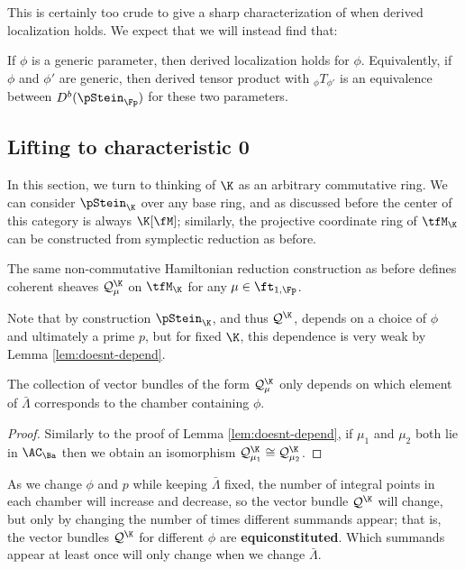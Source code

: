 This is certainly too crude to give a sharp characterization of when derived localization holds.  We expect that we will instead find that:
\begin{conjecture}
If $\phi$ is a generic parameter, then derived localization holds for $\phi$.  Equivalently, if $\phi$ and $\phi'$ are generic, then derived tensor product with ${}_{\phi}T_{\phi'}$ is an equivalence between $D^b(\pStein_\Fp)$ for these two parameters.
\end{conjecture}

\subsection{Lifting to characteristic 0}

In this section, we turn to thinking of $\K$ as an arbitrary commutative ring.
We can consider $\pStein_\K$ over any base ring, and as discussed before the center of this category is always $\K[\fM]$;  similarly, the projective coordinate ring of $\tfM_{\K}$ can be constructed from symplectic reduction as before.  

The same non-commutative Hamiltonian reduction construction as before defines coherent sheaves $\mathcal{Q}_\mu^{\K}$ on $\tfM_{\K}$ for any $\mu \in \ft_{1,\Fp}$.

Note that by construction $\pStein_\K$, and thus $\mathcal{Q}^{\K}$, depends on a choice of
$\phi$ and ultimately a prime $p$, but for fixed $\K$, this dependence is very
weak by Lemma \ref{lem:doesnt-depend}.  
\begin{lemma}\label{lem:doesnt-depend2}
  The collection of vector bundles
  of the form $\mathcal{Q}_\mu^{\K}$ only
  depends on which element of $\bar \Lambda$ corresponds to the
  chamber containing $\phi$.
\end{lemma}
\begin{proof} Similarly to the proof of Lemma \ref{lem:doesnt-depend}, if
  $\mu_1$ and $\mu_2$ both lie in $\AC_{\Ba}$ then we obtain an
  isomorphism $\mathcal{Q}_{\mu_1}^{\K}\cong \mathcal{Q}_{\mu_2}^{\K}$.
\end{proof}
As we change $\phi$ and $p$ while keeping $\bar \Lambda$ fixed, the
number of integral points in each chamber will increase and decrease, so the vector
bundle $\mathcal{Q}^{\K}$ will change, but only by changing the
number of times different summands appear; that is, the vector bundles $\mathcal{Q}^{\K}$ for different $\phi$ are {\bf equiconstituted}.  Which summands appear at
least once will only change when we change $\bar \Lambda$.  


